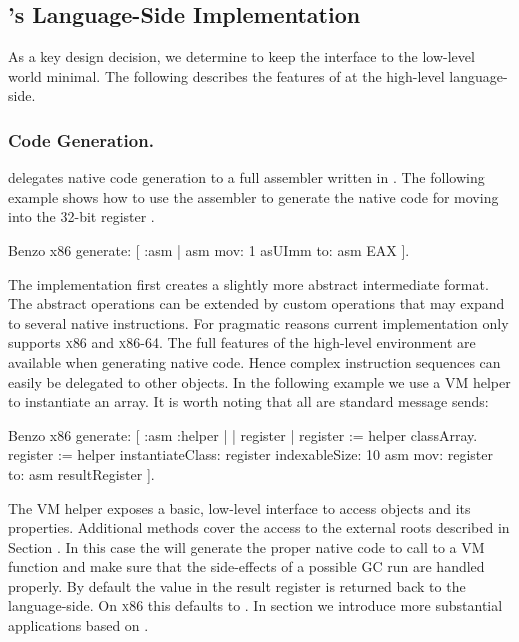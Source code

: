 \subsection{\B's Language-Side Implementation}
As a key design decision, we determine to keep the interface to the low-level world minimal.
The following describes the features of \B at the high-level language-side.

\subsubsection{Code Generation.}

\B delegates native code generation to a full assembler written in \ST. The following example shows how to use the assembler to generate the native code for moving  into the 32-bit register .
%
\begin{stcode}{4}
Benzo x86 generate: [ :asm |
	asm mov: 1 asUImm to: asm EAX ].
\end{stcode}
%
The implementation first creates a slightly more abstract intermediate format.
The abstract operations can be extended by custom operations that may expand to several native instructions. For pragmatic reasons current implementation only supports \textsc{x86} and \textsc{x86-64}.
%
%
The full features of the high-level environment are available when generating native code.
Hence complex instruction sequences can easily be delegated to other objects.
In the following example we use a VM helper to instantiate an array. It is worth noting that all are standard message sends:
%
\begin{stcode}{5}
Benzo x86 generate: [ :asm :helper | | register |
	register := helper classArray.
	register := helper 
		instantiateClass: register
		indexableSize: 10
	asm mov: register to: asm resultRegister ].
\end{stcode}
%
The VM helper exposes a basic, low-level interface to access objects and its properties.
Additional methods cover the access to the external roots described in Section .
In this case the  will generate the proper native code to call to a VM function and make sure that the side-effects of a possible GC run are handled properly.
By default the value in the result register is returned back to the language-side. On \textsc{x86} this defaults to .
In section  we introduce more substantial applications based on \B.

